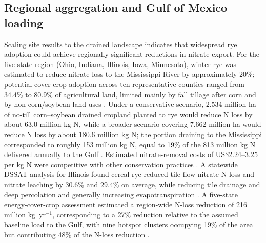 \subsection{Regional aggregation and Gulf of Mexico loading}
Scaling site results to the drained landscape indicates that widespread rye adoption could achieve regionally significant reductions in nitrate export. For the five-state region (Ohio, Indiana, Illinois, Iowa, Minnesota), winter rye was estimated to reduce nitrate loss to the Mississippi River by approximately 20\%; potential cover-crop adoption across ten representative counties ranged from 34.4\% to 80.9\% of agricultural land, limited mainly by fall tillage after corn and by non-corn/soybean land uses \parencite{Kladivko2014}. Under a conservative scenario, 2.534 million ha of no-till corn--soybean drained cropland planted to rye would reduce N loss by about 63.0 million kg N, while a broader scenario covering 7.662 million ha would reduce N loss by about 180.6 million kg N; the portion draining to the Mississippi corresponded to roughly 153 million kg N, equal to 19\% of the 813 million kg N delivered annually to the Gulf \parencite{Kladivko2014}. Estimated nitrate-removal costs of US\$2.24--3.25 per kg N were competitive with other conservation practices \parencite{Kladivko2014}. A statewide DSSAT analysis for Illinois found cereal rye reduced tile-flow nitrate-N loss and nitrate leaching by 30.6\% and 29.4\% on average, while reducing tile drainage and deep percolation and generally increasing evapotranspiration \parencite{Gupta2023b}. A five-state energy-cover-crop assessment estimated a region-wide N-loss reduction of 216 million kg~yr$^{-1}$, corresponding to a 27\% reduction relative to the assumed baseline load to the Gulf, with nine hotspot clusters occupying 19\% of the area but contributing 48\% of the N-loss reduction \parencite{Malone2023}.

